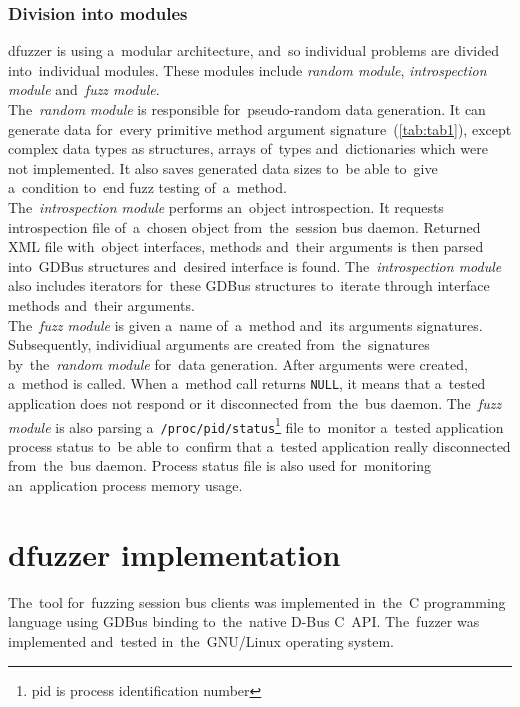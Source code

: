 \subsubsection{Division into modules}
dfuzzer is using a~modular architecture, and~so individual problems are divided
into~individual modules. These modules include \emph{random module},
\emph{introspection module} and~\emph{fuzz module}.\\

The~\emph{random module} is responsible for~pseudo-random data generation. It can
generate data for~every primitive method argument signature~(\ref{tab:tab1}), except
complex data types as structures, arrays of~types and~dictionaries which were
not implemented. It also saves generated data sizes to~be able to~give a~condition
to~end fuzz testing of~a~method.\\

The~\emph{introspection module} performs an~object introspection. It requests
introspection file of~a~chosen object from~the~session bus daemon. Returned XML file
with~object interfaces, methods and~their arguments is then parsed into~GDBus
structures and~desired interface is found. The~\emph{introspection module} also
includes iterators for~these GDBus structures to~\mbox{iterate} through interface
methods and~their arguments.\\

The~\emph{fuzz module} is given a~name of~a~method and~its arguments signatures.
Subsequently, individiual arguments are created from~the~signatures
by~the~\emph{random module} for~data generation. After arguments were created,
a~method is called. When a~method call returns \texttt{NULL}, it means that a~tested
application does not respond or it disconnected from~the~bus daemon.
The~\emph{fuzz module} is also parsing a~\texttt{/proc/pid/status}\footnote{pid is process identification number} file to~monitor a~tested application process status
to~be able to~confirm that a~tested application really disconnected from~the~bus
daemon. Process status file is also used for~monitoring an~application process
memory usage.\\


\section{dfuzzer implementation}
The~tool for~fuzzing session bus clients was implemented in~the~C
programming language using GDBus binding to~the~native D-Bus C~API. The~fuzzer was
implemented and~tested in~the~GNU/Linux operating system.\\

